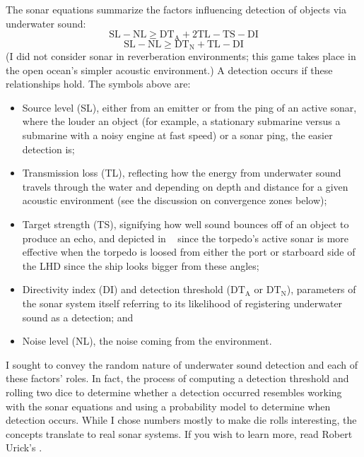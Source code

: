 \documentclass[../TacSubGameRules.tex]{subfiles}
\begin{document}
The sonar equations summarize the factors influencing detection of objects via underwater sound:
\begin{equation}
    \tag{Active}
    \text{SL} - \text{NL}\ge \text{DT}_{\text{A}} +2\text{TL}-\text{TS} - \text{DI}
\end{equation}
\begin{equation}
    \tag{Passive}
    \text{SL} -  \text{NL}\ge\text{DT}_{\text{N}} + \text{TL}-\text{DI}  
\end{equation}
(I did not consider sonar in reverberation environments; this game takes place in the open ocean's simpler acoustic environment.)
A detection occurs if these relationships hold. The symbols above are:
\begin{itemize}
    \item Source level (SL), either from an emitter or from the ping of an active sonar, where the louder an object (for example, a stationary submarine versus a submarine with a noisy engine at fast speed) or a sonar ping, the easier detection is;
    \item Transmission loss (TL), reflecting how the energy from underwater sound travels through the water and depending on depth and distance for a given acoustic environment (see the discussion on convergence zones below);
    \item Target strength (TS), signifying how well sound bounces off of an object to produce an echo, and depicted in \gametitle~ since the torpedo's active sonar is more effective when the torpedo is loosed from either the port or starboard side of the LHD since the ship looks bigger from these angles;
    \item Directivity index (DI) and detection threshold ($\text{DT}_{{\text{A}}}$ or $\text{DT}_{\text{N}}$), parameters of the sonar system itself referring to its likelihood of registering underwater sound as a detection; and
    \item Noise level (NL), the noise coming from the environment.
\end{itemize}
I sought to convey the random nature of underwater sound detection and each of these factors' roles.
In fact, the process of computing a detection threshold and rolling two dice to determine whether a detection occurred resembles working with the sonar equations and using a probability model to determine when detection occurs.
While I chose numbers mostly to make die rolls interesting, the concepts translate to real sonar systems.
If you wish to learn more, read Robert Urick's .
\end{document}
